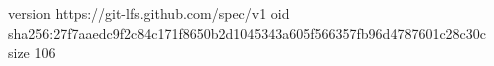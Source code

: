 version https://git-lfs.github.com/spec/v1
oid sha256:27f7aaedc9f2c84c171f8650b2d1045343a605f566357fb96d4787601c28c30c
size 106

